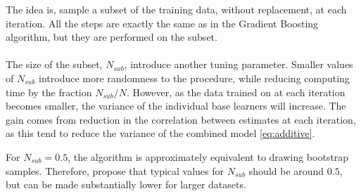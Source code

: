The idea is, sample a subset of the training data, without replacement, at each iteration. All the steps are exactly the same as in the Gradient Boosting algorithm, but they are performed on the subset. \\
\\
The size of the subset, $N_{sub}$, introduce another tuning parameter. Smaller values of $N_{sub}$ introduce more randomness to the procedure, while reducing computing time by the fraction $N_{sub}/N$. However, as the data trained on at each iteration becomes smaller, the variance of the individual base learners will increase. The gain comes from reduction in the correlation between estimates at each iteration, as this tend to reduce the variance of the combined model \eqref{eq:additive}.

For $N_{sub} = 0.5$, the algorithm is approximately equivalent to drawing bootstrap samples. Therefore, \cite{modstat} propose that typical values for $N_{sub}$ should be around $0.5$, but can be made substantially lower for larger datasets.

